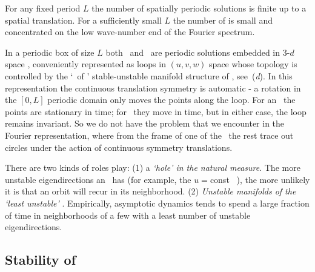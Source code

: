 For any fixed period $L$ the number
of spatially periodic solutions is finite up to a spatial translation.
For a sufficiently small $L$
the number of {\eqva} is small and
concentrated on the low wave-number end of the Fourier spectrum.

In a periodic box of size $L$
both \eqva\ and \reqva\ are  periodic solutions
embedded in 3-$d$ space ,
conveniently represented as loops in
$(u,v,w)$ space whose topology is controlled by the
`\eqva\ of \eqva' stable-unstable manifold structure of
, see \,(\textit{d}).
In this representation the continuous translation symmetry
is automatic - a rotation in the $[0,L]$ periodic domain only
moves the points along the loop. For an \eqv\ the points
are stationary in time; for \reqv\ they move in time, but in
either case, the loop remains invariant.
So we do not have the problem that we encounter in the Fourier
representation, where from the frame of one of the \eqva\
the rest trace out circles under the action of continuous symmetry
translations.

%
There are two kinds of roles
{\eqva} play:
(1)
a {\em `hole' in the natural measure}.
The more unstable eigendirections an \eqv\ has (for example, the
$u=$const \eqv~\EQV{0}), the more unlikely it is  that
an orbit will recur in its neighborhood.
(2)
{\em Unstable manifolds of the `least unstable' {\eqva}}.
Empirically, asymptotic dynamics tends to spend
a large fraction of time in
neighborhoods of a few  {\eqva} with
a least number of unstable eigendirections.



\subsection{Stability of \eqva}
\label{s:StabEqui}


